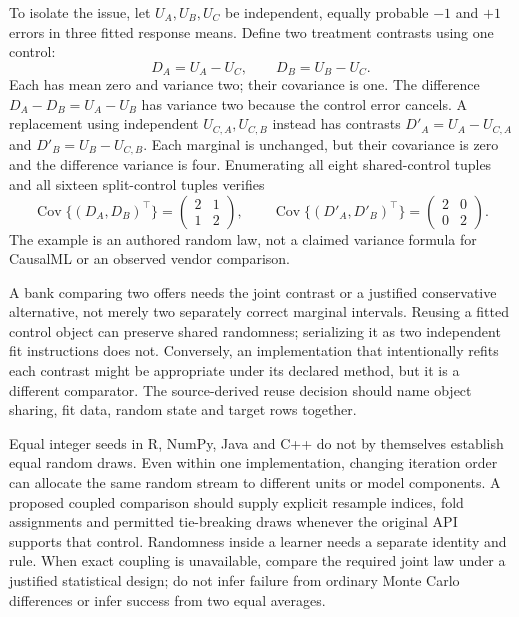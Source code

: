 To isolate the issue, let $U_A,U_B,U_C$ be independent, equally probable
$-1$ and $+1$ errors in three fitted response means. Define two treatment
contrasts using one control:
\begin{equation}
 D_A=U_A-U_C,\qquad D_B=U_B-U_C.
 \label{exec17:s9-shared-control}
\end{equation}
Each has mean zero and variance two; their covariance is one. The difference
$D_A-D_B=U_A-U_B$ has variance two because the control error cancels. A
replacement using independent $U_{C,A},U_{C,B}$ instead has contrasts
$D'_A=U_A-U_{C,A}$ and $D'_B=U_B-U_{C,B}$. Each marginal is unchanged,
but their covariance is zero and the difference variance is four.
Enumerating all eight shared-control tuples and all sixteen split-control
tuples verifies
\begin{equation}
 \operatorname{Cov}\{(D_A,D_B)^\top\}=
 \begin{pmatrix}2&1\\1&2\end{pmatrix},\qquad
 \operatorname{Cov}\{(D'_A,D'_B)^\top\}=
 \begin{pmatrix}2&0\\0&2\end{pmatrix}.
 \label{exec17:s9-joint-covariance}
\end{equation}
The example is an authored random law, not a claimed variance formula for
CausalML or an observed vendor comparison.

A bank comparing two offers needs the joint contrast or a justified conservative
alternative, not merely two separately correct marginal intervals. Reusing a
fitted control object can preserve shared randomness; serializing it as two
independent fit instructions does not. Conversely, an implementation that
intentionally refits each contrast might be appropriate under its declared
method, but it is a different comparator. The source-derived reuse decision
should name object sharing, fit data, random state and target rows together.

Equal integer seeds in R, NumPy, Java and C++ do not by themselves establish
equal random draws. Even within one implementation, changing iteration order
can allocate the same random stream to different units or model components.
A proposed coupled comparison should supply explicit resample indices,
fold assignments and permitted tie-breaking draws whenever the original API
supports that control. Randomness inside a learner needs a separate identity
and rule. When exact coupling is unavailable, compare the required joint law
under a justified statistical design; do not infer failure from ordinary
Monte Carlo differences or infer success from two equal averages.

